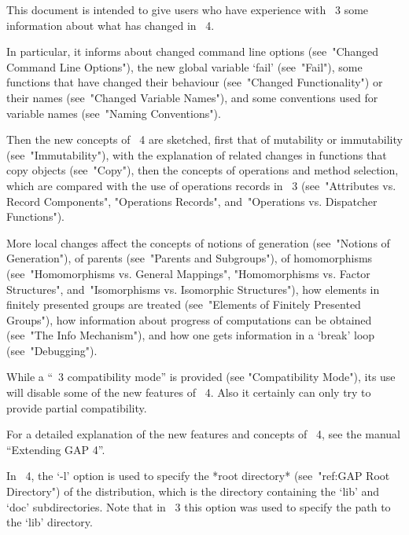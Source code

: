

This document is intended to give users who have experience with {\GAP}~3
some information about what has changed in {\GAP}~4.

In particular, it informs about changed command line options
(see~"Changed Command Line Options"),
the new global variable `fail' (see~"Fail"),
some functions that have changed their behaviour
(see~"Changed Functionality") or their names
(see~"Changed Variable Names"),
and some conventions used for variable names (see~"Naming Conventions").

Then the new concepts of {\GAP}~4 are sketched,
first that of mutability or immutability (see~"Immutability"),
with the explanation of related changes in functions that copy objects
(see~"Copy"),
then the concepts of operations and method selection, which are compared
with the use of operations records in {\GAP}~3
(see~"Attributes vs. Record Components", "Operations Records",
and~"Operations vs. Dispatcher Functions").

More local changes affect the concepts of notions of generation
(see~"Notions of Generation"), of parents (see~"Parents and Subgroups"),
of homomorphisms (see~"Homomorphisms vs. General Mappings",
"Homomorphisms vs. Factor Structures",
and~"Isomorphisms vs. Isomorphic Structures"),
how elements in finitely presented groups are treated
(see~"Elements of Finitely Presented Groups"),
how information about progress of computations can be obtained
(see~"The Info Mechanism"),
and how one gets information in a `break' loop
(see~"Debugging").

While a ``{\GAP}~3 compatibility mode'' is provided
(see "Compatibility Mode"),
its use will disable some of the new features of {\GAP}~4.
Also it certainly can only try to provide partial compatibility.

For a detailed explanation of the new features and concepts of {\GAP}~4,
see the manual ``Extending GAP 4''.



In {\GAP}~4, the `-l' option is used to specify the *root directory*
(see~"ref:GAP Root Directory") of the {\GAP} distribution,
which is the directory containing the `lib' and `doc' subdirectories.
Note that in {\GAP}~3 this option was used to specify the path to the
`lib' directory.

